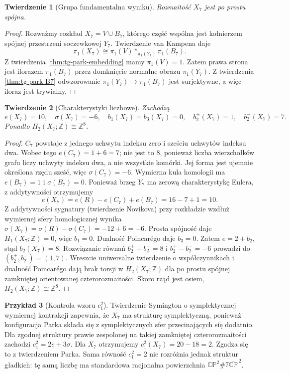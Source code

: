 \documentclass[11pt,a4paper]{report}
\numberwithin{equation}{section}
\theoremstyle{plain}
\newtheorem{twierdzenie}{Twierdzenie}[section]
\theoremstyle{definition}
\newtheorem{przyklad}[twierdzenie]{Przykład}
\theoremstyle{remark}
\begin{document}
\begin{twierdzenie}[Grupa fundamentalna wyniku]
\label{thm:tg-park-pi1}
Rozmaitość $X_7$ jest po prostu spójna.
\end{twierdzenie}

\begin{proof}
Rozważmy rozkład $X_7=V\cup B_7$,
którego część wspólna jest kołnierzem spójnej
przestrzeni soczewkowej $Y_7$.
Twierdzenie van Kampena daje
\[
\pi_1(X_7)\cong
\pi_1(V)*_{\pi_1(Y_7)}\pi_1(B_7).
\]
Z twierdzenia \ref{thm:tg-park-embedding} mamy
$\pi_1(V)=1$. Zatem prawa strona jest ilorazem
$\pi_1(B_7)$ przez domknięcie normalne obrazu
$\pi_1(Y_7)$. Z twierdzenia \ref{thm:tg-park-B7}
odwzorowanie $\pi_1(Y_7)\to\pi_1(B_7)$ jest
surjektywne, a więc iloraz jest trywialny.
\end{proof}

\begin{twierdzenie}[Charakterystyki liczbowe]
\label{thm:tg-park-numbers}
Zachodzą
\[
e(X_7)=10,\quad \sigma(X_7)=-6,\quad
b_1(X_7)=b_3(X_7)=0,\quad
b_2^+(X_7)=1,\quad b_2^-(X_7)=7.
\]
Ponadto $H_2(X_7;\mathbb Z)\cong\mathbb Z^8$.
\end{twierdzenie}

\begin{proof}
$C_7$ powstaje z jednego uchwytu indeksu zero
i sześciu uchwytów indeksu dwa. Wobec tego
$e(C_7)=1+6=7$; nie jest to $8$, ponieważ
liczba wierzchołków grafu liczy uchwyty indeksu
dwa, a nie wszystkie komórki. Jej forma jest
ujemnie określona rzędu sześć, więc
$\sigma(C_7)=-6$.
Wymierna kula homologii ma $e(B_7)=1$ i
$\sigma(B_7)=0$.
Ponieważ brzeg $Y_7$ ma zerową charakterystykę
Eulera, z addytywności otrzymujemy
\[
e(X_7)=e(R)-e(C_7)+e(B_7)=16-7+1=10.
\]
Z addytywności sygnatury (twierdzenie Novikova)
przy rozkładzie wzdłuż wymiernej sfery homologicznej
wynika $\sigma(X_7)=\sigma(R)-\sigma(C_7)=-12+6=-6$.
Prosta spójność daje $H_1(X_7;\mathbb Z)=0$, więc
$b_1=0$. Dualność Poincarégo daje $b_3=0$.
Zatem $e=2+b_2$, stąd $b_2(X_7)=8$.
Rozwiązanie równań $b_2^++b_2^-=8$ i
$b_2^+-b_2^-=-6$ prowadzi do $(b_2^+,b_2^-)=(1,7)$.
Wreszcie uniwersalne twierdzenie o współczynnikach
i dualność Poincarégo dają brak torsji w
$H_2(X_7;\mathbb Z)$ dla po prostu spójnej zamkniętej
orientowanej czterorozmaitości. Skoro rząd jest osiem,
$H_2(X_7;\mathbb Z)\cong\mathbb Z^8$.
\end{proof}

\begin{przyklad}[Kontrola wzoru $c_1^2$]
Twierdzenie Symington o symplektycznej wymiernej kontrakcji
zapewnia, że $X_7$ ma strukturę symplektyczną, ponieważ
konfiguracja Parka składa się z symplektycznych sfer
przecinających się dodatnio. Dla zgodnej struktury prawie
zespolonej na takiej zamkniętej czterorozmaitości zachodzi
$c_1^2=2e+3\sigma$. Dla $X_7$ otrzymujemy
$c_1^2(X_7)=20-18=2$.
Zgadza się to z twierdzeniem Parka. Sama równość
$c_1^2=2$ nie rozróżnia jednak struktur gładkich:
tę samą liczbę ma standardowa racjonalna powierzchnia
$\mathbb{CP}^{2}\#7\overline{\mathbb{CP}}^{\,2}$.
\end{przyklad}
\end{document}

